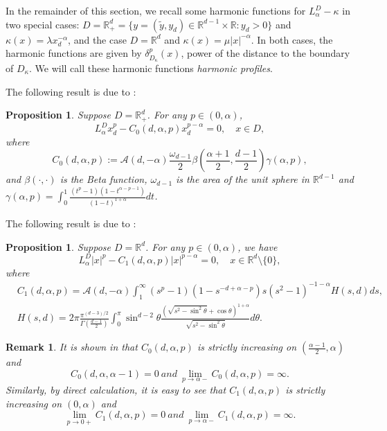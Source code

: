 \documentclass[12pt,a4paper]{amsart}
\numberwithin{equation}{section}
\theoremstyle{plain}
\newcommand{\mb}{\mathbb}
\newcommand{\1}{\mathbbm{1}}
\newtheorem{remark}[theorem]{Remark}
\newtheorem{prop}[theorem]{Proposition}
\begin{document}
In the remainder of this section, we recall some harmonic functions for $L^D_\alpha-\kappa$ in two special cases:
$D =\mb R_+^d = \{y= (\widetilde{y},y_d) \in \mathbb{R}^{d-1} \times \mathbb{R}: y_d > 0\}$ and $\kappa(x)=\lambda x_d^{-\alpha}$, and the case $D=\mb R^d$ and $\kappa(x)=\mu |x|^{-\alpha}$. 
In both cases, the harmonic functions are given 
by $\delta_{D_\kappa}^p(x)$, power of the distance to the boundary of $D_\kappa$.
We will call these harmonic functions \textit{harmonic profiles}.


The following result  is due to \cite[(5.4)]{BBC03}: 
\begin{prop} \label{harmonic: 1 codimension}
Suppose $D= \mathbb{R}_+^d$. For any $p \in (0,\alpha)$, 
\begin{equation} 
L^D_\alpha x_d^p -C_0(d,\alpha,p)x_d^{p-\alpha} = 0, \quad x\in D,
\end{equation}
where 
\begin{equation}\label{constant 1: C_0(d,p)}
C_0(d,\alpha,p):= \mathcal{A}(d,-\alpha) \frac{\omega_{d-1}}{2}\beta(\frac{\alpha+1}{2},\frac{d-1}{2}) \gamma(\alpha,p), 
\end{equation}
and $\beta(\cdot,\cdot)$ is the Beta function, $\omega_{d-1}$ is the area of the unit sphere in $\mathbb{R}^{d-1}$ and $\gamma(\alpha,p) = \int_{0}^1 \frac{(t^p-1)(1-t^{\alpha-p-1})}{(1-t)^{1+\alpha}}dt$. 
\end{prop}
The following result  is due to \cite[Theorem 1]{Ferrari12}:
\begin{prop} \label{harmonic: higher codimension}
Suppose $D=\mb R^d$. For any $p\in (0,\alpha)$, we have
\begin{equation} 
L^D_\alpha |x|^p- C_1(d,\alpha,p)|x|^{p-\alpha} = 0, \quad x\in \mb R^d\setminus \{0\},
\end{equation}
where 
\begin{equation}\label{constant 2: C_1(d,p)}
\begin{aligned}
& C_1(d,\alpha,p) = \mathcal{A}(d,-\alpha) \int_1^{\infty} (s^p-1)(1-s^{-d+\alpha- p})s(s^2-1)^{-1-\alpha} H(s,d)ds, \\
& H(s,d) = 2\pi \frac{\pi^{(d-3)/2}}{\Gamma(\frac{d-1}{2})} \int_0^{\pi} \sin^{d-2}\theta \frac{(\sqrt{s^2 - \sin^2 \theta} + \cos \theta)^{1+\alpha}}{\sqrt{s^2 - \sin^2 \theta}}d\theta. 
\end{aligned}
\end{equation}
\end{prop}

\begin{remark} \label{constant: relation}
It is shown in \cite[Section 3.1]{CKSV20} that $C_0(d,\alpha,p)$ is strictly increasing on $(\frac{\alpha-1}{2},\alpha)$ and $$
C_0(d,\alpha,\alpha -1) = 0\ and \ \lim_{p \to \alpha -} C_0(d,\alpha,p) = \infty.$$
Similarly, by direct calculation, it is easy to see that $C_1(d,\alpha,p)$ is strictly increasing on $(0,\alpha)$ and $$
\lim_{p \to 0+}C_1(d,\alpha,p) = 0\ and \ \lim_{p \to \alpha-}C_1(d,\alpha,p) = \infty.$$
\end{remark}
\end{document}
